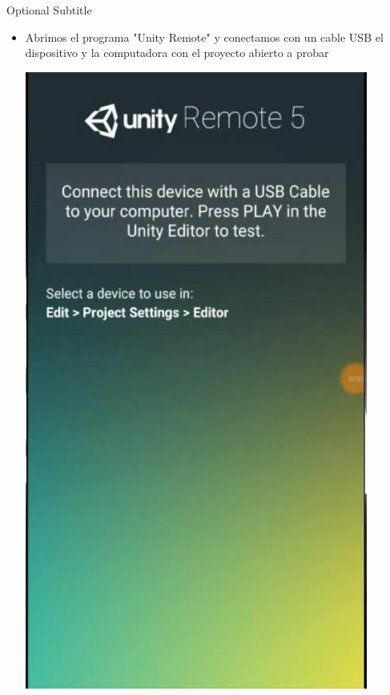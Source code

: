 \documentclass{beamer}
\begin{document}
\begin{frame}{06}{Optional Subtitle}
  \begin{itemize}
  \item {
    Abrimos el programa "Unity Remote" y conectamos con un cable USB el dispositivo y la computadora con el proyecto abierto a probar
  }
  
  \includegraphics[height=0.6\paperheight]{image2/UR06}
  \centering
  \end{itemize}
\end{frame}
\end{document}
